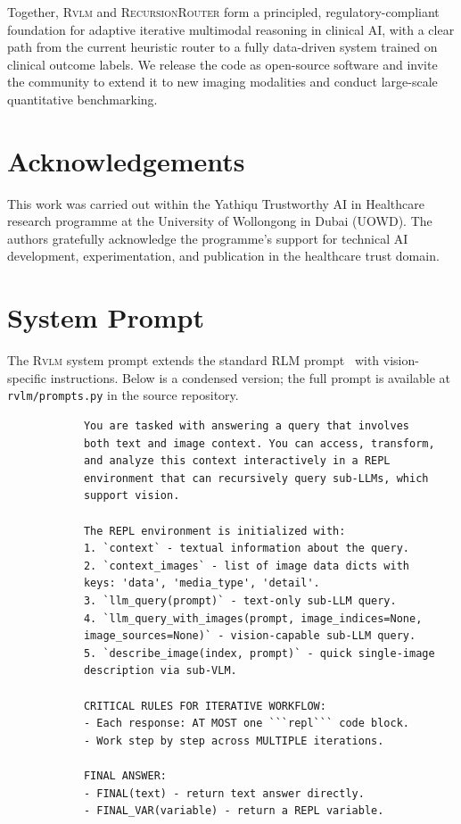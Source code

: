 \documentclass{article}
\newcommand{\RVLM}{\textsc{Rvlm}}
\newcommand{\RRouter}{\textsc{RecursionRouter}}
\begin{document}
	Together, \RVLM{} and \RRouter{} form a principled, regulatory-compliant
	foundation for adaptive iterative multimodal reasoning in clinical AI, with
	a clear path from the current heuristic router to a fully data-driven system
	trained on clinical outcome labels.
	We release the code as open-source software and invite the community to extend
	it to new imaging modalities and conduct large-scale quantitative benchmarking.
	
	\section*{Acknowledgements}
	
	This work was carried out within the Yathiqu Trustworthy AI in Healthcare
	research programme at the University of Wollongong in Dubai (UOWD).
	The authors gratefully acknowledge the programme's support for technical AI
	development, experimentation, and publication in the healthcare trust domain.
	
	\appendix
	
	\section{System Prompt}
	\label{appx:prompts}
	
	The \RVLM{} system prompt extends the standard RLM prompt~\citep{zhang2025rlm}
	with vision-specific instructions.
	Below is a condensed version; the full prompt is available at
	\texttt{rvlm/prompts.py} in the source repository.
	
	\begin{tcolorbox}[colback=gray!5,colframe=gray!50,
		title={\small \RVLM{} System Prompt (condensed)},
		fonttitle=\small\bfseries,breakable]
		\small
		\begin{verbatim}
			You are tasked with answering a query that involves
			both text and image context. You can access, transform,
			and analyze this context interactively in a REPL
			environment that can recursively query sub-LLMs, which
			support vision.
			
			The REPL environment is initialized with:
			1. `context` - textual information about the query.
			2. `context_images` - list of image data dicts with
			keys: 'data', 'media_type', 'detail'.
			3. `llm_query(prompt)` - text-only sub-LLM query.
			4. `llm_query_with_images(prompt, image_indices=None,
			image_sources=None)` - vision-capable sub-LLM query.
			5. `describe_image(index, prompt)` - quick single-image
			description via sub-VLM.
			
			CRITICAL RULES FOR ITERATIVE WORKFLOW:
			- Each response: AT MOST one ```repl``` code block.
			- Work step by step across MULTIPLE iterations.
			
			FINAL ANSWER:
			- FINAL(text) - return text answer directly.
			- FINAL_VAR(variable) - return a REPL variable.
		\end{verbatim}
	\end{tcolorbox}
	
\end{document}
